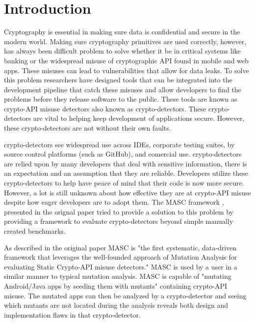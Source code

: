 \chapter{Introduction}
\label{chap_intro}


Cryptography is essential in making sure data is confidential and secure in the modern world. Making sure cryptography primitives are used correctly, however, has always been difficult problem to solve whether it be in critical systems like banking or the widespread misuse of cryptographic API found in mobile and web apps. These misuses can lead to vulnerabilities that allow for data leaks. To solve this problem researchers have designed tools that can be integrated into the development pipeline that catch these misuses and allow developers to find the problems before they release software to the public. These tools are known as crypto-API misuse detectors also known as crypto-detectors. These crypto-detectors are vital to helping keep development of applications secure. However, these crypto-detectors are not without their own faults.

crypto-detectors see widespread use across IDEs, corporate testing suites, by source control platforms (such as GitHub), and comercial use. crypto-detectors are relied upon by many developers that deal with sensitive information, there is an expectation and an assumption that they are reliable. Developers utilize these crypto-detectors to help have peace of mind that their code is now more secure. However, a lot is still unknown about how effective they are at crypto-API misuse despite how eager developers are to adopt them. The MASC framework \cite{Ami_2022}, presented in the orignal paper tried to provide a solution to this problem by providing a framework to evaluate crypto-detectors beyond simple manually created benchmarks.

As described in the original paper MASC is "the first systematic, data-driven framework that leverages the well-founded approach of Mutation Analysis for evaluating Static Crypto-API misuse detectors." MASC is used by a user in a similar manner to typical mutation analysis. MASC is capable of "mutating Android/Java apps by seeding them with mutants" containing crypto-API misuse. The mutated apps can then be analyzed by a crypto-detector and seeing which mutants are not located during the analysis reveals both design and implementation flaws in that crypto-detector.

